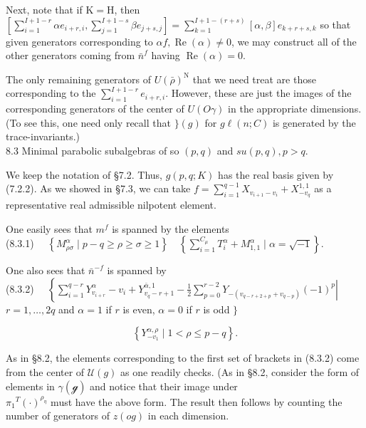 \documentclass[10pt]{article}
\begin{document}
Next, note that if $\mathrm{K}=\mathrm{H}$, then\\
$\left[\sum_{i=1}^{I+1-r} \alpha e_{i+r, i}, \sum_{j=1}^{I+1-s} \beta e_{j+s, j}\right]=\sum_{k=1}^{I+1-(r+s)}[\alpha, \beta] e_{k+r+s, k}$ so that\\
given generators corresponding to $\alpha f, \operatorname{Re}(\alpha) \neq 0$, we may construct all of the other generators coming from $\bar{n}^{f}$ having $\operatorname{Re}(\alpha)=0$.

The only remaining generators of $U(\bar{\rho})^{\mathrm{N}}$ that we need treat are those corresponding to the $\sum_{i=1}^{I+1-r} e_{i+r, i}$. However, these are just the images of the corresponding generators of the center of $U(O \gamma)$ in the appropriate dimensions. (To see this, one need only recall that $\}(g)$ for $g \ell(n ; C)$ is generated by the trace-invariants.)\\
8.3 Minimal parabolic subalgebras of so $(p, q)$ and $s u(p, q), p>q$.

We keep the notation of §7.2. Thus, $g(p, q ; K)$ has the real basis given by (7.2.2). As we showed in §7.3, we can take $f=\sum_{i=1}^{q-1} X_{v_{i+1}-v_{i}}+X_{-v_{q}}^{1,1}$ as a representative real admissible nilpotent element.

One easily sees that $m^{f}$ is spanned by the elements\\
(8.3.1) $\quad\left\{M_{\rho \sigma}^{\alpha} \mid p-q \geq \rho \geq \sigma \geq 1\right\} \quad\left\{\sum_{i=1}^{C_{\mu}} T_{i}^{\alpha}+M_{1,1}^{\alpha} \mid \alpha=\sqrt{-1}\right\}$.

One also sees that $\bar{n}^{-f}$ is spanned by\\
(8.3.2) $\quad\left\{\left.\sum_{i=1}^{q-r} Y_{v_{i+r}}^{\alpha}-v_{i}+Y_{v_{q}-r+1}^{\bar{\alpha}, 1}-\frac{1}{2} \sum_{p=0}^{r-2} Y_{-\left(v_{q-r+2+p}+v_{q-p}\right)}(-1)^{p} \right\rvert\,\right.$\\
$r=1, \ldots, 2 q$ and $\alpha=1$ if $r$ is even, $\alpha=0$ if $r$ is odd $\}$

$$
\left\{Y_{-v_{1}}^{\alpha, \rho} \mid 1<\rho \leq p-q\right\} .
$$

As in §8.2, the elements corresponding to the first set of brackets in (8.3.2) come from the center of $\mathcal{U}(g)$ as one readily checks. (As in §8.2, consider the form of elements in $\mathcal{\gamma}(\mathcal{g})$ and notice that their image under\\
$\pi_{1}{ }^{T}(\cdot)^{\rho_{\eta}}$ must have the above form. The result then follows by counting the number of generators of $z(o g)$ in each dimension.
\end{document}
